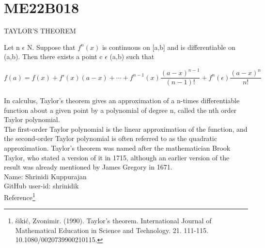 \section{ME22B018}
\begin{center}
	{\large TAYLOR'S THEOREM}
\end{center}
Let n \( \epsilon \) N. Suppose that \( f^{n}(x) \) is continuous on [a,b] and is differentiable on (a,b). Then there exists a point c \( \epsilon \) (a,b) such that

\[ f(a) = f(x) + f'(x)(a-x) + \cdots + f^{n-1}(x)\frac{(a-x)^{n-1}}{(n-1)\mathrm{!}} + f^{n}(\epsilon)\frac{(a-x)^{n}}{n\mathrm{!}} \]\\In calculus, Taylor's theorem gives an approximation of a n-times differentiable function about a given point by a polynomial of degree n, called the nth order Taylor polynomial.\\[\baselineskip]
The first-order Taylor polynomial is the linear approximation of the function, and the second-order Taylor polynomial is often referred to as the quadratic approximation. Taylor's theorem was named after the mathematician Brook Taylor, who stated a version of it in 1715, although an earlier version of the result was already mentioned by James Gregory in 1671.\\[\baselineskip]
Name: Shrinidi Kuppurajan\\
GitHub user-id: shrinidik\\[\baselineskip]
Reference\footnote{šikić, Zvonimir. (1990). Taylor's theorem. International Journal of Mathematical Education in Science and Technology. 21. 111-115. 10.1080/0020739900210115.}

